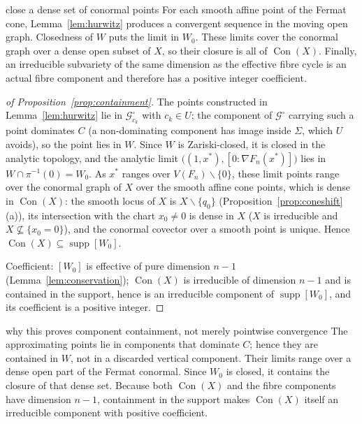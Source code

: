 \documentclass[acmsmall,screen,nonacm]{acmart}
\theoremstyle{definition}
\theoremstyle{remark}
\DeclareMathOperator{\Con}{Con}
\DeclareMathOperator{\supp}{supp}
\newcommand{\Gfam}{\mathcal{G}}
\begin{document}
\begin{roadmapbox}{close a dense set of conormal points}
For each smooth affine point of the Fermat cone, Lemma~\ref{lem:hurwitz}
produces a convergent sequence in the moving open graph.  Closedness of $W$
puts the limit in $W_0$.  These limits cover the conormal graph over a dense
open subset of $X$, so their closure is all of $\Con(X)$.  Finally, an
irreducible subvariety of the same dimension as the effective fibre cycle is
an actual fibre component and therefore has a positive integer coefficient.
\end{roadmapbox}

\begin{proof}[of Proposition~\ref{prop:containment}]
The points constructed in Lemma~\ref{lem:hurwitz} lie in
$\Gfam^\circ_{c_k}$ with $c_k\in U$; the component of $\Gfam^\circ$
carrying such a point dominates $C$ (a non-dominating component has
image inside $\Sigma$, which $U$ avoids), so the point lies in $W$.
Since $W$ is Zariski-closed, it is closed in the analytic topology,
and the analytic limit
$\big((1,x^*),[0:\nabla F_n(x^*)]\big)$ lies in
$W\cap\pi^{-1}(0)=W_0$.  As $x^*$ ranges over
$V(F_n)\smallsetminus\{0\}$, these limit points range over the
conormal graph of $X$ over the smooth affine cone points, which is
dense in $\Con(X)$: the smooth locus of $X$ is
$X\smallsetminus\{q_0\}$ (Proposition~\ref{prop:coneshift}(a)), its
intersection with the chart $x_0\ne0$ is dense in $X$ ($X$ is
irreducible and $X\not\subseteq\{x_0=0\}$), and the conormal covector
over a smooth point is unique.  Hence
$\Con(X)\subseteq\supp[W_0]$.

Coefficient: $[W_0]$ is effective of pure dimension $n-1$
(Lemma~\ref{lem:conservation}); $\Con(X)$ is irreducible of dimension
$n-1$ and is contained in the support, hence is an irreducible
component of $\supp[W_0]$, and its coefficient is a positive integer.
\end{proof}

\begin{checklistbox}{why this proves component containment, not merely pointwise convergence}
The approximating points lie in components that dominate $C$; hence they are
contained in $W$, not in a discarded vertical component.  Their limits range
over a dense open part of the Fermat conormal.  Since $W_0$ is closed, it
contains the closure of that dense set.  Because both $\Con(X)$ and the fibre
components have dimension $n-1$, containment in the support makes
$\Con(X)$ itself an irreducible component with positive coefficient.
\end{checklistbox}
\end{document}
